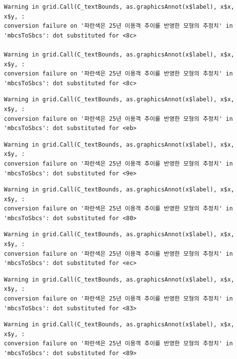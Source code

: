 \documentclass[
  letterpaper,
  DIV=11,
  numbers=noendperiod]{scrreprt}
\begin{document}
\begin{verbatim}
Warning in grid.Call(C_textBounds, as.graphicsAnnot(x$label), x$x, x$y, :
conversion failure on '파란색은 25년 이용객 추이를 반영한 모형의 추정치' in
'mbcsToSbcs': dot substituted for <8c>

Warning in grid.Call(C_textBounds, as.graphicsAnnot(x$label), x$x, x$y, :
conversion failure on '파란색은 25년 이용객 추이를 반영한 모형의 추정치' in
'mbcsToSbcs': dot substituted for <8c>
\end{verbatim}

\begin{verbatim}
Warning in grid.Call(C_textBounds, as.graphicsAnnot(x$label), x$x, x$y, :
conversion failure on '파란색은 25년 이용객 추이를 반영한 모형의 추정치' in
'mbcsToSbcs': dot substituted for <eb>
\end{verbatim}

\begin{verbatim}
Warning in grid.Call(C_textBounds, as.graphicsAnnot(x$label), x$x, x$y, :
conversion failure on '파란색은 25년 이용객 추이를 반영한 모형의 추정치' in
'mbcsToSbcs': dot substituted for <9e>
\end{verbatim}

\begin{verbatim}
Warning in grid.Call(C_textBounds, as.graphicsAnnot(x$label), x$x, x$y, :
conversion failure on '파란색은 25년 이용객 추이를 반영한 모형의 추정치' in
'mbcsToSbcs': dot substituted for <80>
\end{verbatim}

\begin{verbatim}
Warning in grid.Call(C_textBounds, as.graphicsAnnot(x$label), x$x, x$y, :
conversion failure on '파란색은 25년 이용객 추이를 반영한 모형의 추정치' in
'mbcsToSbcs': dot substituted for <ec>
\end{verbatim}

\begin{verbatim}
Warning in grid.Call(C_textBounds, as.graphicsAnnot(x$label), x$x, x$y, :
conversion failure on '파란색은 25년 이용객 추이를 반영한 모형의 추정치' in
'mbcsToSbcs': dot substituted for <83>
\end{verbatim}

\begin{verbatim}
Warning in grid.Call(C_textBounds, as.graphicsAnnot(x$label), x$x, x$y, :
conversion failure on '파란색은 25년 이용객 추이를 반영한 모형의 추정치' in
'mbcsToSbcs': dot substituted for <89>
\end{verbatim}
\end{document}
